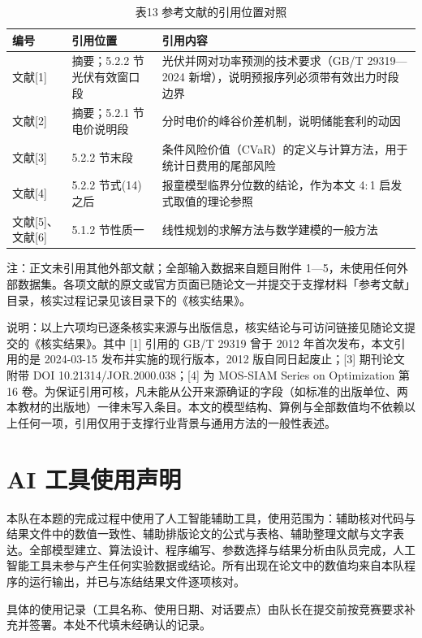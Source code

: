 \documentclass[12pt,a4paper]{ctexart}
\begin{document}
\begin{table}[H]
\centering
\caption*{表13 参考文献的引用位置对照}
\begin{tabular}{C{0.24\textwidth}C{0.38\textwidth}C{0.38\textwidth}}
\toprule
编号 & 引用位置 & 引用内容 \\
\midrule
文献[1] & 摘要；5.2.2 节光伏有效窗口段 & 光伏并网对功率预测的技术要求（GB/T 29319—2024 新增），说明预报序列必须带有效出力时段边界 \\
文献[2] & 摘要；5.2.1 节电价说明段 & 分时电价的峰谷价差机制，说明储能套利的动因 \\
文献[3] & 5.2.2 节末段 & 条件风险价值（CVaR）的定义与计算方法，用于统计日费用的尾部风险 \\
文献[4] & 5.2.2 节式(14)之后 & 报童模型临界分位数的结论，作为本文 4$:$1 启发式取值的理论参照 \\
文献[5]、文献[6] & 5.1.2 节性质一 & 线性规划的求解方法与数学建模的一般方法 \\
\bottomrule
\end{tabular}
\par\vspace{2pt}\footnotesize 注：正文未引用其他外部文献；全部输入数据来自题目附件 1—5，未使用任何外部数据集。各项文献的原文或官方页面已随论文一并提交于支撑材料「参考文献」目录，核实过程记录见该目录下的《核实结果》。
\end{table}

说明：以上六项均已逐条核实来源与出版信息，核实结论与可访问链接见随论文提交的《核实结果》。其中 [1] 引用的 GB/T 29319 曾于 2012 年首次发布，本文引用的是 2024-03-15 发布并实施的现行版本，2012 版自同日起废止；[3] 期刊论文附带 DOI 10.21314/JOR.2000.038；[4] 为 MOS-SIAM Series on Optimization 第 16 卷。为保证引用可核，凡未能从公开来源确证的字段（如标准的出版单位、两本教材的出版地）一律未写入条目。本文的模型结构、算例与全部数值均不依赖以上任何一项，引用仅用于支撑行业背景与通用方法的一般性表述。

\section*{AI 工具使用声明}

本队在本题的完成过程中使用了人工智能辅助工具，使用范围为：辅助核对代码与结果文件中的数值一致性、辅助排版论文的公式与表格、辅助整理文献与文字表达。全部模型建立、算法设计、程序编写、参数选择与结果分析由队员完成，人工智能工具未参与产生任何实验数据或结论。所有出现在论文中的数值均来自本队程序的运行输出，并已与冻结结果文件逐项核对。

具体的使用记录（工具名称、使用日期、对话要点）由队长在提交前按竞赛要求补充并签署。本处不代填未经确认的记录。
\end{document}

